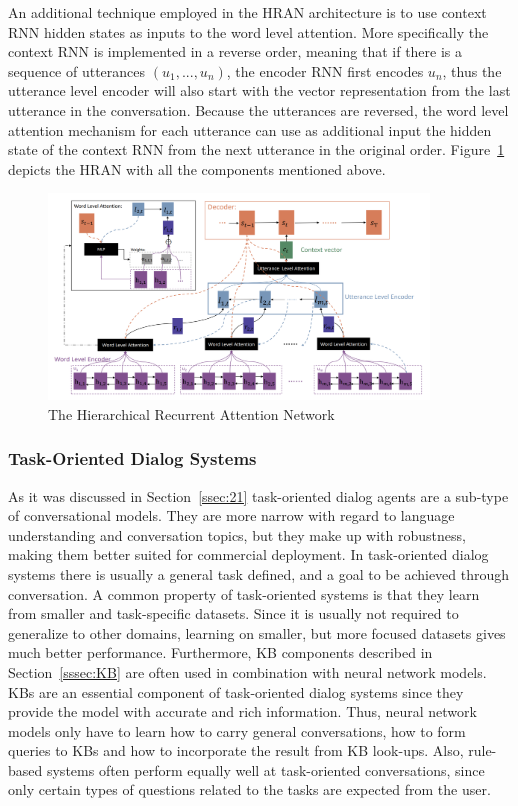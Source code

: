 \documentclass[12pt]{article}
\begin{document}
An additional technique employed in the HRAN architecture is to use context RNN hidden states as inputs to the word level attention. More specifically the context RNN is implemented in a reverse order, meaning that if there is a sequence of utterances \((u_1,...,u_n)\), the encoder RNN first encodes \(u_n\), thus the utterance level encoder will also start with the vector representation from the last utterance in the conversation. Because the utterances are reversed, the word level attention mechanism for each utterance can use as additional input the hidden state of the context RNN from the next utterance in the original order. Figure~\ref{fig:HRAN} depicts the HRAN with all the components mentioned above.
\begin{figure}[H]
	\centering
	\includegraphics[width=0.9\textwidth]{pics/hran.png}
	\caption{The Hierarchical Recurrent Attention Network \cite{Xing:2017}}
	\label{fig:HRAN}
\end{figure}


\subsubsection{Task-Oriented Dialog Systems} \label{sssec:task}
As it was discussed in Section~\ref{ssec:21} task-oriented dialog agents are a sub-type of conversational models. They are more narrow with regard to language understanding and conversation topics, but they make up with robustness, making them better suited for commercial deployment. In task-oriented dialog systems there is usually a general task defined, and a goal to be achieved through conversation. A common property of task-oriented systems is that they learn from smaller and task-specific datasets. Since it is usually not required to generalize to other domains, learning on smaller, but more focused datasets gives much better performance. Furthermore, KB components described in Section~\ref{sssec:KB} are often used in combination with neural network models. KBs are an essential component of task-oriented dialog systems since they provide the model with accurate and rich information. Thus, neural network models only have to learn how to carry general conversations, how to form queries to KBs and how to incorporate the result from KB look-ups. Also, rule-based systems often perform equally well at task-oriented conversations, since only certain types of questions related to the tasks are expected from the user.
\end{document}
